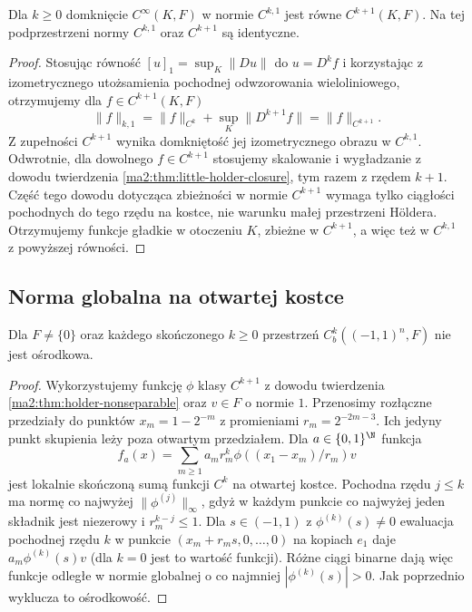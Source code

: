 \begin{wniosek}
\label{ma2:cor:holder-one-closure}
Dla $k\ge0$ domknięcie $C^\infty(K,F)$
w normie $C^{k,1}$ jest równe $C^{k+1}(K,F)$.
Na tej podprzestrzeni normy $C^{k,1}$ oraz
$C^{k+1}$ są identyczne.
\end{wniosek}
\begin{proof}
Stosując równość $[u]_1=\sup_K\|Du\|$
do $u=D^kf$ i korzystając z izometrycznego
utożsamienia pochodnej odwzorowania
wieloliniowego, otrzymujemy dla
$f\in C^{k+1}(K,F)$
\[
 \|f\|_{k,1}=\|f\|_{C^k}+\sup_K\|D^{k+1}f\|
 =\|f\|_{C^{k+1}}.
\]
Z zupełności $C^{k+1}$ wynika domkniętość
jej izometrycznego obrazu w $C^{k,1}$.
Odwrotnie, dla dowolnego $f\in C^{k+1}$
stosujemy skalowanie i wygładzanie
z dowodu twierdzenia
\ref{ma2:thm:little-holder-closure},
tym razem z rzędem $k+1$.
Część tego dowodu dotycząca zbieżności
w normie $C^{k+1}$ wymaga tylko ciągłości
pochodnych do tego rzędu na kostce,
nie warunku małej przestrzeni H\"oldera.
Otrzymujemy funkcje gładkie w otoczeniu
$K$, zbieżne w $C^{k+1}$, a więc też
w $C^{k,1}$ z powyższej równości.
\end{proof}

\subsection{Norma globalna na otwartej kostce}

\begin{stwierdzenie}
\label{ma2:prop:cbk-open-nonseparable}
Dla $F\ne\{0\}$ oraz każdego skończonego $k\ge0$
przestrzeń $C_b^k((-1,1)^n,F)$ nie jest ośrodkowa.
\end{stwierdzenie}
\begin{proof}
Wykorzystujemy funkcję $\phi$ klasy $C^{k+1}$
z dowodu twierdzenia \ref{ma2:thm:holder-nonseparable}
oraz $v\in F$ o normie $1$. Przenosimy
rozłączne przedziały do punktów
$x_m=1-2^{-m}$ z promieniami $r_m=2^{-2m-3}$.
Ich jedyny punkt skupienia leży poza otwartym
przedziałem. Dla $a\in\{0,1\}^{\N}$ funkcja
\[
 f_a(x)=\sum_{m\ge1}a_m r_m^k
                  \phi((x_1-x_m)/r_m)v
\]
jest lokalnie skończoną sumą funkcji $C^k$
na otwartej kostce. Pochodna rzędu $j\le k$
ma normę co najwyżej
$\|\phi^{(j)}\|_\infty$, gdyż w każdym
punkcie co najwyżej jeden składnik
jest niezerowy i $r_m^{k-j}\le1$.
Dla $s\in(-1,1)$ z $\phi^{(k)}(s)\ne0$
ewaluacja pochodnej rzędu $k$ w punkcie
$(x_m+r_ms,0,\ldots,0)$ na kopiach $e_1$
daje $a_m\phi^{(k)}(s)v$ (dla $k=0$
jest to wartość funkcji).
Różne ciągi binarne dają więc funkcje
odległe w normie globalnej o co najmniej
$|\phi^{(k)}(s)|>0$. Jak poprzednio
wyklucza to ośrodkowość.
\end{proof}


